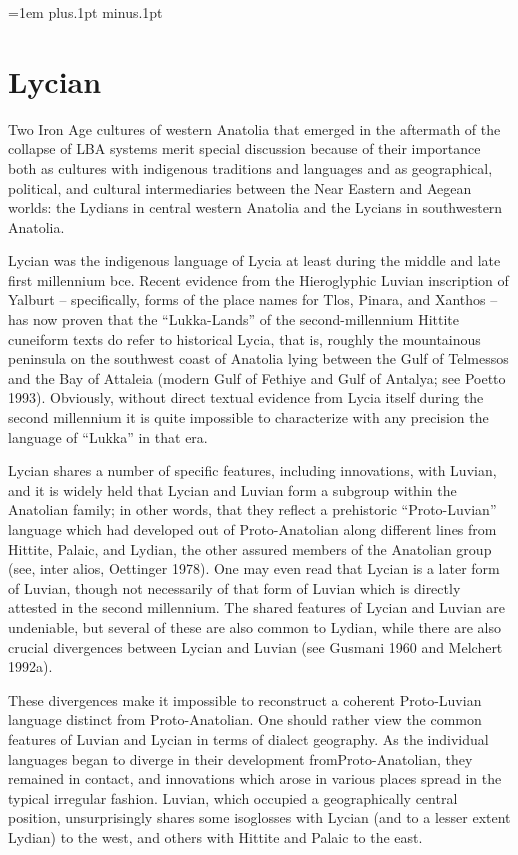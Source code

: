 \parindent=1em
\parskip=12pt plus.1pt minus.1pt
\chapter{Lycian}
\label{sec:lycian}

Two Iron Age cultures of western Anatolia that emerged in the aftermath of the
collapse of \ac{LBA} systems merit special discussion because of
their importance both as cultures with indigenous traditions and languages and
as geographical, political, and cultural intermediaries between the Near Eastern
and Aegean worlds: the Lydians in central western Anatolia and the Lycians in
southwestern Anatolia.

Lycian was the indigenous language of Lycia at least during the middle
and late first millennium bce. Recent evidence from the Hieroglyphic Luvian inscription of
Yalburt – specifically, forms of the place names for Tlos, Pinara, and Xanthos – has now
proven that the “Lukka-Lands” of the second-millennium Hittite cuneiform texts do refer
to historical Lycia, that is, roughly the mountainous peninsula on the southwest coast of
Anatolia lying between the Gulf of Telmessos and the Bay of Attaleia (modern Gulf of
Fethiye and Gulf of Antalya; see Poetto 1993). Obviously, without direct textual evidence
from Lycia itself during the second millennium it is quite impossible to characterize with
any precision the language of “Lukka” in that era.

Lycian shares a number of specific features, including innovations, with Luvian, and it
is widely held that Lycian and Luvian form a subgroup within the Anatolian family; in
other words, that they reflect a prehistoric “Proto-Luvian” language which had developed
out of Proto-Anatolian along different lines from Hittite, Palaic, and Lydian, the other
assured members of the Anatolian group (see, inter alios, Oettinger 1978). One may even
read that Lycian is a later form of Luvian, though not necessarily of that form of Luvian
which is directly attested in the second millennium. The shared features of Lycian and
Luvian are undeniable, but several of these are also common to Lydian, while there are also
crucial divergences between Lycian and Luvian (see Gusmani 1960 and Melchert 1992a).


These divergences make it impossible to reconstruct a coherent Proto-Luvian language
distinct from Proto-Anatolian. One should rather view the common features of Luvian
and Lycian in terms of dialect geography. As the individual languages began to diverge in
their development fromProto-Anatolian, they remained in contact, and innovations which
arose in various places spread in the typical irregular fashion. Luvian, which occupied a
geographically central position, unsurprisingly shares some isoglosses with Lycian (and to
a lesser extent Lydian) to the west, and others with Hittite and Palaic to the east.

